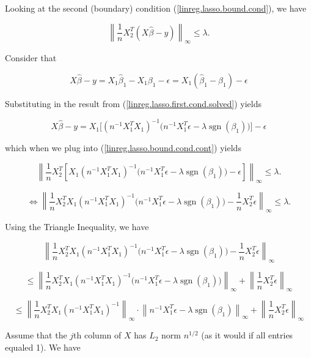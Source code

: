 Looking at the second (boundary) condition (\ref{linreg.lasso.bound.cond}), we have

\begin{equation}\label{linreg.lasso.bound.cond.cont}
\left\lVert \frac{1}{n} X_{2}^T (X \hat{\beta} - y) \right\rVert_\infty \leq \lambda.
\end{equation}

Consider that 

\[
X \hat{\beta}- y = X_1 \hat{\beta}_1 - X_1 \beta_1 - \epsilon = X_1(\hat{\beta}_1 - \beta_1) - \epsilon
\]

Substituting in the result from (\ref{linreg.lasso.first.cond.solved}) yields

\[
X \hat{\beta}- y  = X_1\big[  ( n^{-1} X_1^TX_1)^{-1} \big( n^{-1} X_1^T \epsilon -  \lambda  \operatorname{sgn}(\beta_1)\big)   \big] - \epsilon
\]

which when we plug into (\ref{linreg.lasso.bound.cond.cont}) yields

\[
\left\lVert \frac{1}{n} X_{2}^T \left[X_1  (n^{-1} X_1^TX_1)^{-1} \big( n^{-1} X_1^T \epsilon -  \lambda  \operatorname{sgn}(\beta_1)\big) - \epsilon\right] \right\rVert_\infty \leq \lambda.
\]

\[
\iff \left\lVert \frac{1}{n} X_{2}^T X_1 (n^{-1} X_1^TX_1)^{-1} \big( n^{-1} X_1^T \epsilon -  \lambda  \operatorname{sgn}(\beta_1)\big)    -  \frac{1}{n} X_{2}^T \epsilon \right\rVert_\infty \leq \lambda.
\]

Using the Triangle Inequality, we have

\[
\left\lVert \frac{1}{n} X_{2}^T X_1 (n^{-1} X_1^TX_1)^{-1} \big( n^{-1} X_1^T \epsilon -  \lambda  \operatorname{sgn}(\beta_1)\big)    -  \frac{1}{n} X_{2}^T \epsilon \right\rVert_\infty 
\]

\[
\leq \left\lVert \frac{1}{n} X_{2}^T X_1 (n^{-1} X_1^TX_1)^{-1} \big( n^{-1} X_1^T \epsilon -  \lambda  \operatorname{sgn}(\beta_1)\big)  \right\rVert_\infty + \left\lVert  \frac{1}{n} X_{2}^T \epsilon \right\rVert_\infty 
\]

\begin{equation}\label{linreg.lasso.bound.cond.cont.more}
\leq \left\lVert \frac{1}{n} X_{2}^T  X_1 (n^{-1} X_1^TX_1)^{-1} \right\rVert_\infty \cdot \left\lVert  n^{-1} X_1^T \epsilon -  \lambda  \operatorname{sgn}(\beta_1)    \right\rVert_\infty + \left\lVert  \frac{1}{n} X_{2}^T \epsilon \right\rVert_\infty 
\end{equation}

Assume that the \(j\)th column of \(X\) has \(L_2\) norm \(n^{1/2}\) (as it would if all entries equaled 1). We have


